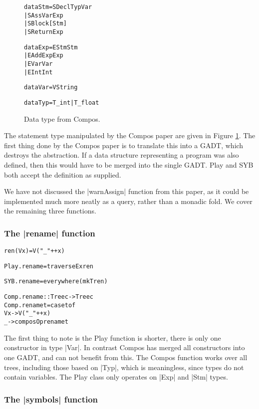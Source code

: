 \documentclass[preprint]{sigplanconf}
\newenvironment{code}{\begin{alltt}\small}{\end{alltt}}
\begin{document}
\begin{figure}
\begin{code}
data Stm  =  SDecl    Typ Var
          |  SAss     Var Exp
          |  SBlock   [Stm]
          |  SReturn  Exp

data Exp  =  EStm  Stm
          |  EAdd  Exp Exp
          |  EVar  Var
          |  EInt  Int

data Var  =  V String

data Typ  =  T_int | T_float
\end{code}
\caption{Data type from Compos.}
\label{fig:compos}
\end{figure}

The statement type manipulated by the Compos paper are given in Figure \ref{fig:compos}. The first thing done by the Compos paper is to translate this into a GADT, which destroys the abstraction. If a data structure representing a program was also defined, then this would have to be merged into the single GADT. Play and SYB both accept the definition as supplied.

We have not discussed the |warnAssign| function from this paper, as it could be implemented much more neatly as a query, rather than a monadic fold. We cover the remaining three functions.

\subsubsection{The |rename| function}

\begin{code}
ren (V x) = V ("_" ++ x)

Play.rename = traverseEx ren

SYB.rename = everywhere (mkT ren)

Comp.rename :: Tree c -> Tree c
Comp.rename t = case t of
    V x -> V ("_" ++ x)
    _   -> composOp rename t
\end{code}

The first thing to note is the Play function is shorter, there is only one constructor in type |Var|. In contrast Compos has merged all constructors into one GADT, and can not benefit from this. The Compos function works over all trees, including those based on |Typ|, which is meaningless, since types do not contain variables. The Play class only operates on |Exp| and |Stm| types.


\subsubsection{The |symbols| function}
\end{document}
